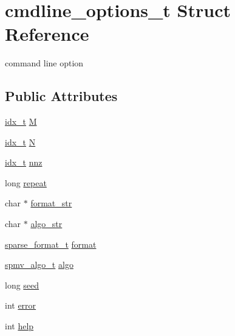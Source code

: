 \hypertarget{structcmdline__options__t}{}\section{cmdline\+\_\+options\+\_\+t Struct Reference}
\label{structcmdline__options__t}


command line option  


\subsection*{Public Attributes}
\begin{DoxyCompactItemize}
\item 
\hyperlink{spmv_8cc_a8e93478a00e685bea5e6a3f617bf03a3}{idx\+\_\+t} \hyperlink{structcmdline__options__t_aeb40f98dbcd53dc727b1d7dbb566924f}{M}
\item 
\hyperlink{spmv_8cc_a8e93478a00e685bea5e6a3f617bf03a3}{idx\+\_\+t} \hyperlink{structcmdline__options__t_aa58f87808071259b5aa8f17c64bf2960}{N}
\item 
\hyperlink{spmv_8cc_a8e93478a00e685bea5e6a3f617bf03a3}{idx\+\_\+t} \hyperlink{structcmdline__options__t_aec8f7846348926cda6d62023f62d0d25}{nnz}
\item 
long \hyperlink{structcmdline__options__t_acb60cada2976487316be88bf4309e7d6}{repeat}
\item 
char $\ast$ \hyperlink{structcmdline__options__t_ac64246d1391692f9065a904a33908118}{format\+\_\+str}
\item 
char $\ast$ \hyperlink{structcmdline__options__t_a6ced644aa5213ebc0bc73794ba5d4931}{algo\+\_\+str}
\item 
\hyperlink{spmv_8cc_a8c0094893526c01b430903b2d9227256}{sparse\+\_\+format\+\_\+t} \hyperlink{structcmdline__options__t_af8a99d8cdebe0bc5fd512d2254727231}{format}
\item 
\hyperlink{spmv_8cc_ad2cf0493af54bf76c5be68b4634fcab7}{spmv\+\_\+algo\+\_\+t} \hyperlink{structcmdline__options__t_afddf83f65e6e4a14761d84a5e876e6ac}{algo}
\item 
long \hyperlink{structcmdline__options__t_a065412d7cdc54cdae630389c3fda266e}{seed}
\item 
int \hyperlink{structcmdline__options__t_a25f9087b240da0b93a4295fa5f173c88}{error}
\item 
int \hyperlink{structcmdline__options__t_ab02741e43bb19900e87caaec3a8dd794}{help}
\end{DoxyCompactItemize}


